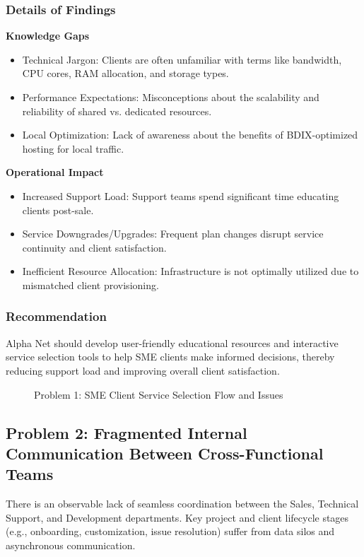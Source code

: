 \subsubsection*{Details of Findings}
\textbf{Knowledge Gaps}
\begin{itemize}
    \item Technical Jargon: Clients are often unfamiliar with terms like bandwidth, CPU cores, RAM allocation, and storage types.
    \item Performance Expectations: Misconceptions about the scalability and reliability of shared vs. dedicated resources.
    \item Local Optimization: Lack of awareness about the benefits of BDIX-optimized hosting for local traffic.
\end{itemize}
\textbf{Operational Impact}
\begin{itemize}
    \item Increased Support Load: Support teams spend significant time educating clients post-sale.
    \item Service Downgrades/Upgrades: Frequent plan changes disrupt service continuity and client satisfaction.
    \item Inefficient Resource Allocation: Infrastructure is not optimally utilized due to mismatched client provisioning.
\end{itemize}

\subsubsection*{Recommendation}
Alpha Net should develop user-friendly educational resources and interactive service selection tools to help SME clients make informed decisions, thereby reducing support load and improving overall client satisfaction.

\begin{figure}[ht]
\centering

\caption{Problem 1: SME Client Service Selection Flow and Issues}
\label{fig:problem1_flowchart}
\end{figure}

\subsection{Problem 2: Fragmented Internal Communication Between Cross-Functional Teams}
There is an observable lack of seamless coordination between the Sales, Technical Support, and Development departments. Key project and client lifecycle stages (e.g., onboarding, customization, issue resolution) suffer from data silos and asynchronous communication.

